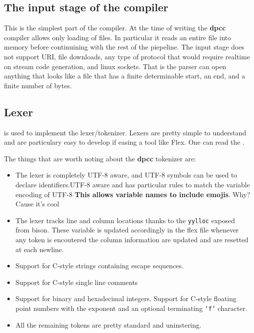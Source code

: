 \documentclass[a4paper]{article}
\newcommand{\urlref}[3][blue]{\href{#2}{\color{#1}{#3}}}%
\begin{document}
\subsection{The input stage of the compiler}
This is the simplest part of the compiler. At the time of writing the \textbf{dpcc} compiler
allows only loading of files. In particular it reads an entire file into memory before continuining
with the rest of the piepeline. The input stage does not support URI, file downloads, any type of protocol
that would require realtime on stream code generation, and linux sockets. That is the
parser can open anything that looks like a file that has a finite determinable start, an end,
and a finite number of bytes.

\subsection{Lexer}

\urlref{https://github.com/westes/flex/}{Flex} is used to implement the lexer/tokenizer. Lexers are pretty simple to understand and
are particulary easy to develop if easing a tool like Flex. One can read the \urlref{https://www.cs.virginia.edu/~cr4bd/flex-manual/}{Flex Manual}.

The things that are worth noting about the \textbf{dpcc} tokenizer are:

\begin{itemize}
\item The lexer is completely UTF-8 aware, and UTF-8 symbols can be used to declare identifiers.UTF-8 aware and has particular
rules to match the variable encoding of UTF-8 \textbf{This allows variable names to include emojis}. Why? Cause it's cool \smiley
\item The lexer tracks line and column locations thanks to the \texttt{yylloc} exposed from bison. These
    variable is updated accordingly in the flex file whenever any token is encoutered the column information
    are updated and are resetted at each newline.
\item Support for C-style strings containing escape sequences.
\item Support for C-style single line comments
\item Support for binary and hexadecimal integers. Support for C-style floating point numbers with the exponent and an optional terminating \texttt{`f'} character.
\item All the remaining tokens are pretty standard and uninstering.
\end{itemize}
\end{document}
